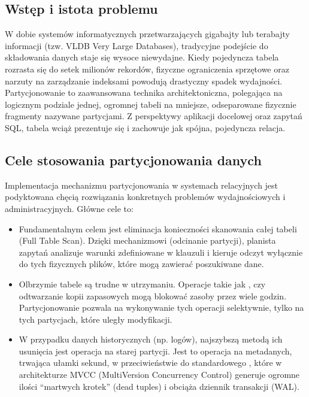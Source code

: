 \documentclass[a4paper,11pt,english,openany,oneside]{sphinxmanual}
\begin{document}
\subsection{Wstęp i istota problemu}
\label{\detokenize{rozdzial_2/rozdzial_26/index:wstep-i-istota-problemu}}
\sphinxAtStartPar
W dobie systemów informatycznych przetwarzających gigabajty lub terabajty informacji (tzw. VLDB \sphinxhyphen{} Very Large Databases), tradycyjne podejście do składowania danych staje się wysoce niewydajne. Kiedy pojedyncza tabela rozrasta się do setek milionów rekordów, fizyczne ograniczenia sprzętowe oraz narzuty na zarządzanie indeksami powodują drastyczny spadek wydajności. Partycjonowanie to zaawansowana technika architektoniczna, polegająca na logicznym podziale jednej, ogromnej tabeli na mniejsze, odseparowane fizycznie fragmenty nazywane partycjami. Z perspektywy aplikacji docelowej oraz zapytań SQL, tabela wciąż prezentuje się i zachowuje jak spójna, pojedyncza relacja.


\subsection{Cele stosowania partycjonowania danych}
\label{\detokenize{rozdzial_2/rozdzial_26/index:cele-stosowania-partycjonowania-danych}}
\sphinxAtStartPar
Implementacja mechanizmu partycjonowania w systemach relacyjnych jest podyktowana chęcią rozwiązania konkretnych problemów wydajnościowych i administracyjnych. Główne cele to:
\begin{itemize}
\item {} 
\sphinxAtStartPar
{} Fundamentalnym celem jest eliminacja konieczności skanowania całej tabeli (Full Table Scan). Dzięki mechanizmowi  (odcinanie partycji), planista zapytań analizuje warunki zdefiniowane w klauzuli  i kieruje odczyt wyłącznie do tych fizycznych plików, które mogą zawierać poszukiwane dane.

\item {} 
\sphinxAtStartPar
{} Olbrzymie tabele są trudne w utrzymaniu. Operacje takie jak ,  czy odtwarzanie kopii zapasowych mogą blokować zasoby przez wiele godzin. Partycjonowanie pozwala na wykonywanie tych operacji selektywnie, tylko na tych partycjach, które uległy modyfikacji.

\item {} 
\sphinxAtStartPar
{} W przypadku danych historycznych (np. logów), najszybszą metodą ich usunięcia jest operacja  na starej partycji. Jest to operacja na metadanych, trwająca ułamki sekund, w przeciwieństwie do standardowego , które w architekturze MVCC (Multi\sphinxhyphen{}Version Concurrency Control) generuje ogromne ilości “martwych krotek” (dead tuples) i obciąża dziennik transakcji (WAL).

\end{itemize}
\end{document}
